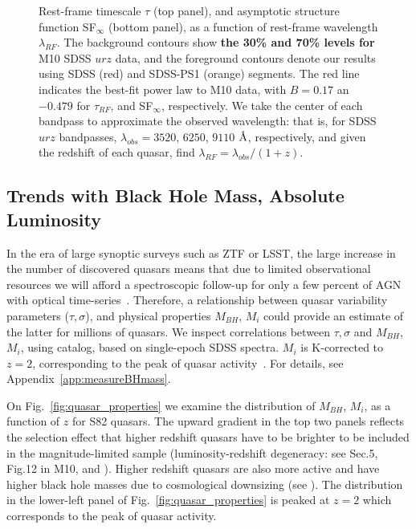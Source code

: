 \documentclass[twocolumn]{aastex62}
\let\oldAA\AA
\renewcommand{\AA}{\text{\normalfont\oldAA}}
\begin{document}
  
\begin{figure}
	\caption{Rest-frame timescale $\tau$ (top panel), and asymptotic structure function SF$_{\infty}$ (bottom panel), as a function of rest-frame wavelength $\lambda_{RF}$. The background contours show \textbf{the 30\% and 70\% levels for}  M10 SDSS $ urz $  data, and the foreground contours  denote our results using  SDSS (red) and SDSS-PS1 (orange) segments. The red line indicates the best-fit power law to M10 data, with $B=0.17$ an $-0.479$ for $\tau_{RF}$, and SF$_{\infty}$, respectively. We take the center of each bandpass to approximate the  observed wavelength: that is, for SDSS $urz$ bandpasses,  $\lambda_{obs} = 3520$, $6250$, $9110$ $\mbox{\AA}$, respectively, and given the redshift of each quasar, find $\lambda_{RF}=\lambda_{obs} / (1+z)$.}
	\label{fig:lambda_dependence}
\end{figure} 




\subsection{Trends with Black Hole Mass, Absolute Luminosity}

In the era of large synoptic surveys such as ZTF or LSST, the large increase in the number of discovered quasars means that due to limited observational resources we will afford a spectroscopic follow-up for only a few percent of AGN with optical time-series~\citep{ivezic2019}. Therefore, a relationship between quasar variability parameters ($\tau, \sigma$), and physical properties $M_{BH}$, $M_{i}$ could provide an estimate of the latter for millions of quasars. We inspect correlations between $\tau, \sigma$  and $M_{BH}$, $M_{i}$, using \cite{shen2011} catalog, based on single-epoch SDSS spectra. $M_{i}$ is K-corrected to  $z= 2$, corresponding to the peak of quasar activity~\citep{richards2006a}. For details, see Appendix~\ref{app:measureBHmass}.

On Fig.~\ref{fig:quasar_properties} we examine the distribution of $M_{BH}$, $M_{i}$, as a function of $z$ for S82 quasars. The upward gradient in the top two panels reflects the selection effect that higher redshift quasars have to be brighter to be included in the magnitude-limited sample (luminosity-redshift degeneracy: see Sec.5, Fig.12 in M10, and \citealt{dong2018}). Higher redshift quasars are also more active  and have higher black hole masses due to cosmological downsizing (see \citealt{babic2007,labita2009, mclure2004}). The distribution in the lower-left panel of Fig.~\ref{fig:quasar_properties} is peaked at $z=2$ which corresponds to the peak of quasar activity. 
\end{document}

